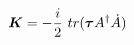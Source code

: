 \begin{equation}
\mbox{\boldmath$K$}=-\frac{i}{2}~tr(\mbox{\boldmath$\tau$}A^\dag \dot{A})  
\end{equation}

